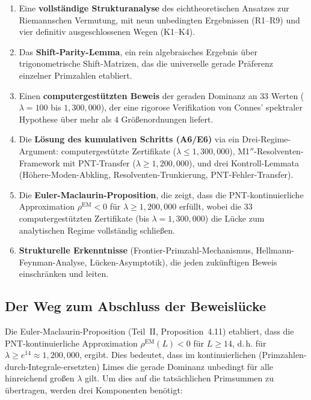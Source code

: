\documentclass[12pt,a4paper]{article}
\theoremstyle{definition}
\theoremstyle{remark}
\begin{document}
\begin{enumerate}
  \item Eine \textbf{vollständige Strukturanalyse} des eichtheoretischen Ansatzes zur Riemannschen Vermutung, mit neun unbedingten Ergebnissen (R1--R9) und vier definitiv ausgeschlossenen Wegen (K1--K4).

  \item Das \textbf{Shift-Parity-Lemma}, ein rein algebraisches Ergebnis über trigonometrische Shift-Matrizen, das die universelle gerade Präferenz einzelner Primzahlen etabliert.

  \item Einen \textbf{computergestützten Beweis} der geraden Dominanz an $33$ Werten ($\lambda = 100$ bis $1{,}300{,}000$), der eine rigorose Verifikation von Connes' spektraler Hypothese über mehr als $4$ Größenordnungen liefert.

  \item Die \textbf{Lösung des kumulativen Schritts (A6/E6)} via ein Drei-Regime-Argument: computergestützte Zertifikate ($\lambda \leq 1{,}300{,}000$), M1$''$-Resolventen-Framework mit PNT-Transfer ($\lambda \geq 1{,}200{,}000$), und drei Kontroll-Lemmata (Höhere-Moden-Abkling, Resolventen-Trunkierung, PNT-Fehler-Transfer).

  \item Die \textbf{Euler-Maclaurin-Proposition}, die zeigt, dass die PNT-kontinuierliche Approximation $\rho^{\mathrm{EM}} < 0$ für $\lambda \geq 1{,}200{,}000$ erfüllt, wobei die $33$ computergestützten Zertifikate (bis $\lambda = 1{,}300{,}000$) die Lücke zum analytischen Regime vollständig schließen.

  \item \textbf{Strukturelle Erkenntnisse} (Frontier-Primzahl-Mechanismus, Hellmann-Feynman-Analyse, Lücken-Asymptotik), die jeden zukünftigen Beweis einschränken und leiten.
\end{enumerate}

\subsection{Der Weg zum Abschluss der Beweislücke}
\label{sec:gap-closure-path}

Die Euler-Maclaurin-Proposition (Teil~II, Proposition~4.11) etabliert, dass die PNT-kontinuierliche Approximation $\rho^{\mathrm{EM}}(L) < 0$ für $L \geq 14$, d.\,h. für $\lambda \geq e^{14} \approx 1{,}200{,}000$, ergibt. Dies bedeutet, dass im kontinuierlichen (Primzahlen-durch-Integrale-ersetzten) Limes die gerade Dominanz unbedingt für alle hinreichend großen $\lambda$ gilt. Um dies auf die tatsächlichen Primsummen zu übertragen, werden drei Komponenten benötigt:
\end{document}
